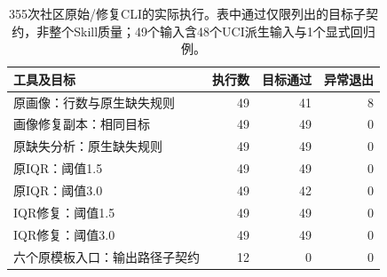 \begin{table}[t]
\caption{355次社区原始/修复CLI的实际执行。表中通过仅限列出的目标子契约，非整个Skill质量；49个输入含48个UCI派生输入与1个显式回归例。}\label{tab:community}
\centering\small
\begin{tabularx}{\textwidth}{Xrrr}
\toprule
工具及目标 & 执行数 & 目标通过 & 异常退出 \\
\midrule
原画像：行数与原生缺失规则 & 49 & 41 & 8 \\
画像修复副本：相同目标 & 49 & 49 & 0 \\
原缺失分析：原生缺失规则 & 49 & 49 & 0 \\
原IQR：阈值1.5 & 49 & 49 & 0 \\
原IQR：阈值3.0 & 49 & 42 & 0 \\
IQR修复：阈值1.5 & 49 & 49 & 0 \\
IQR修复：阈值3.0 & 49 & 49 & 0 \\
六个原模板入口：输出路径子契约 & 12 & 0 & 0 \\
\bottomrule
\end{tabularx}
\end{table}
